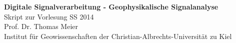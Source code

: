 \begin{titlepage}
\begin{center}
\vspace*{2cm}
\Huge
\textbf{Digitale Signalverarbeitung - Geophysikalische Signalanalyse} \\[2cm]
\LARGE
Skript zur Vorlesung SS 2014\\[3cm]
\Large
Prof. Dr. Thomas Meier \\[7cm]
Institut für Geowissenschaften der Christian-Albrechts-Universität zu Kiel
\end{center}
\end{titlepage} 
